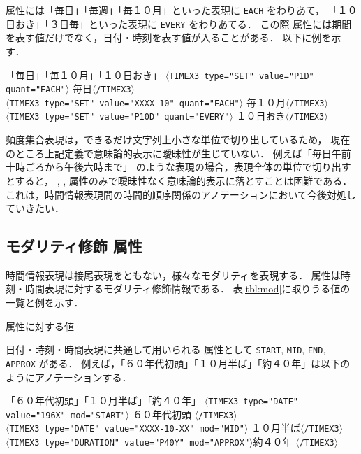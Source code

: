 \documentclass[japanese]{jnlp_1.4}
\def\value{}
\def\freq{}
\def\quant{}
\def\mod{}
\begin{document}
\quant 属性には「毎日」「毎週」「毎１０月」といった表現に {\tt EACH} をわりあて，
「１０日おき」「３日毎」といった表現に {\tt EVERY} をわりあてる．
この際 \value 属性には期間を表す値だけでなく，日付・時刻を表す値が入ることがある．
以下に例を示す．

{\addtolength{\linewidth}{-6zw}\setlength{\leftskip}{3zw}
\begin{itembox}[l]{「毎日」「毎１０月」「１０日おき」}
{\small
{\tt $\langle$TIMEX3 type="SET" value="P1D" quant="EACH"$\rangle$}
毎日{\tt $\langle$/TIMEX3$\rangle$} \\
{\tt $\langle$TIMEX3 type="SET" value="XXXX-10" quant="EACH"$\rangle$}
毎１０月{\tt $\langle$/TIMEX3$\rangle$} \\
{\tt $\langle$TIMEX3 type="SET" value="P10D" quant="EVERY"$\rangle$}
１０日おき{\tt $\langle$/TIMEX3$\rangle$} }
\end{itembox}
\par}

頻度集合表現は，できるだけ文字列上小さな単位で切り出しているため，
現在のところ上記定義で意味論的表示に曖昧性が生じていない．
例えば「毎日午前十時ごろから午後六時まで」
のような表現の場合，表現全体の単位で切り出すとすると，
\value, \freq, \quant 属性のみで曖昧性なく意味論的表示に落とすことは困難である．
これは，時間情報表現間の時間的順序関係のアノテーションにおいて今後対処していきたい．


\subsection{モダリティ修飾 \mod 属性 \label{subsec:mod}}

時間情報表現は接尾表現をともない，様々なモダリティを表現する．
\mod 属性は時刻・時間表現に対するモダリティ修飾情報である．
表\ref{tbl:mod}に取りうる値の一覧と例を示す．

\begin{table}[b]
\caption{\mod 属性に対する値}
\label{tbl:mod}

\end{table}

日付・時刻・時間表現に共通して用いられる \mod 属性として
{\tt START}, {\tt MID}, {\tt END}, {\tt APPROX} がある．
例えば，「６０年代初頭」「１０月半ば」「約４０年」は以下のようにアノテーションする．

{\addtolength{\linewidth}{-6zw}\setlength{\leftskip}{3zw}
\begin{itembox}[l]{「６０年代初頭」「１０月半ば」「約４０年」}
{\small
{\tt $\langle$TIMEX3 type="DATE" value="196X" mod="START"$\rangle$}
６０年代初頭
{\tt $\langle$/TIMEX3$\rangle$} \\
{\tt $\langle$TIMEX3 type="DATE" value="XXXX-10-XX" mod="MID"$\rangle$}
１０月半ば{\tt $\langle$/TIMEX3$\rangle$} \\
{\tt $\langle$TIMEX3 type="DURATION" value="P40Y" mod="APPROX"$\rangle$}約４０年
{\tt $\langle$/TIMEX3$\rangle$} }
\end{itembox}
\par}
\end{document}
